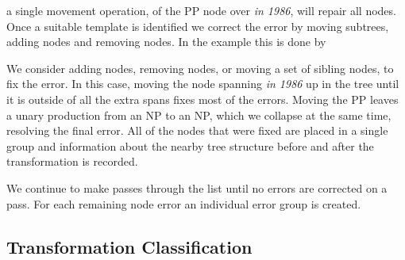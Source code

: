 
a single movement operation, of the PP node over \emph{in 1986}, will repair all nodes.
Once a suitable template is identified we correct the error by moving subtrees,
adding nodes and removing nodes.  In the example this is done by 

We consider adding nodes, removing nodes, or moving a set of sibling nodes, to fix the error.
In this case, moving the node spanning \emph{in 1986} up in the tree until it is outside of all the extra spans fixes most of the errors.
Moving the PP leaves a unary production from an NP to an NP, which we collapse at the same time, resolving the final error.
All of the nodes that were fixed are placed in a single group and information about the nearby tree structure before and after the transformation is recorded.

We continue to make passes through the list until no errors are corrected on a pass.
For each remaining node error an individual error group is created.

\subsection{Transformation Classification}

